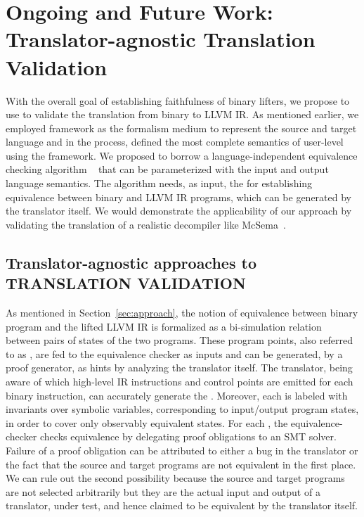 \chapter{Ongoing and Future Work: Translator-agnostic Translation Validation}\label{sec:future} 

With the overall goal of  establishing faithfulness of binary lifters, we propose 
to use \tv to validate the translation from binary to LLVM IR. As mentioned earlier, we employed \K framework as the formalism medium to represent the source and target language and in the process, defined the most complete semantics of user-level \ISA using the framework. We proposed to borrow a language-independent equivalence checking
algorithm ~\cite{TheoSAS19} that can be parameterized with the input and output
language semantics. The algorithm needs, as input, the \syncps for establishing equivalence between binary and LLVM IR programs, which can be generated by the translator itself. We would demonstrate the applicability of our approach by validating the translation of a realistic decompiler like McSema~\cite{McSema:Recon14}.

\section{Translator-agnostic approaches to TRANSLATION VALIDATION}
As mentioned in Section~\ref{sec:approach},
  the notion of equivalence between  binary program and the lifted LLVM IR is
  formalized as a bi-simulation relation~\cite{Sangiorgi:2011} between pairs of
  states of the two programs. These program points, also referred to as
  \syncps, are fed to the equivalence checker as inputs and can
  be generated, by a proof generator,  as hints by analyzing the translator
  itself. The translator, being aware of which high-level IR instructions and
  control points are emitted for each binary instruction, can accurately
  generate the \syncps. Moreover, each \syncp is
  labeled with invariants over symbolic variables, corresponding to
  input/output program states, in order to cover only observably equivalent
  states. For each \syncp, the equivalence-checker checks
  equivalence by delegating proof obligations to an SMT solver. Failure of a proof
  obligation can be attributed to either a bug in the translator or  the fact
  that the source and target programs are not equivalent in the first place. We
  can rule out the second possibility because the source and target programs
  are not selected arbitrarily but they are the actual input and output of a
  translator, under test, and hence claimed to be equivalent by the translator
  itself.
 

